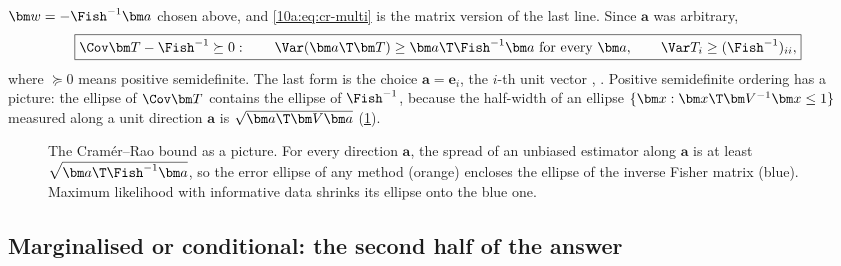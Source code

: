$\bm w=-\Fish^{-1}\bm a$ chosen above, and \eqref{10a:eq:cr-multi} is the matrix version of the last line.
Since $\bm a$ was arbitrary,
\begin{equation}
  \boxed{\Cov\bm T-\Fish^{-1}\succeq0:\qquad
  \Var(\bm a\T\bm T)\ge\bm a\T\Fish^{-1}\bm a\ \text{for every }\bm a,\qquad
  \Var T_i\ge(\Fish^{-1})_{ii},}
  \label{10a:eq:cr-box}
\end{equation}
where $\succeq0$ means positive semidefinite.
The last form is the choice $\bm a=\bm e_i$, the $i$-th unit vector , \cite{TTH1997}.
Positive semidefinite ordering has a picture: the ellipse of $\Cov\bm T$ contains the ellipse of $\Fish^{-1}$,
because the half-width of an ellipse $\{\bm x:\bm x\T\bm V^{-1}\bm x\le1\}$ measured along a unit direction
$\bm a$ is $\sqrt{\bm a\T\bm V\bm a}$ (\cref{10a:fig:cr-nest}).

\begin{figure}[htbp]
\centering
{}
\caption{The Cram\'er--Rao bound as a picture. For every direction $\bm a$, the spread of an unbiased
estimator along $\bm a$ is at least $\sqrt{\bm a\T\Fish^{-1}\bm a}$, so the error ellipse of any method (orange)
encloses the ellipse of the inverse Fisher matrix (blue). Maximum likelihood with informative data shrinks
its ellipse onto the blue one.}
\label{10a:fig:cr-nest}
\end{figure}

\subsection{Marginalised or conditional: the second half of the answer}
\label{10a:sec:cr-diag}


